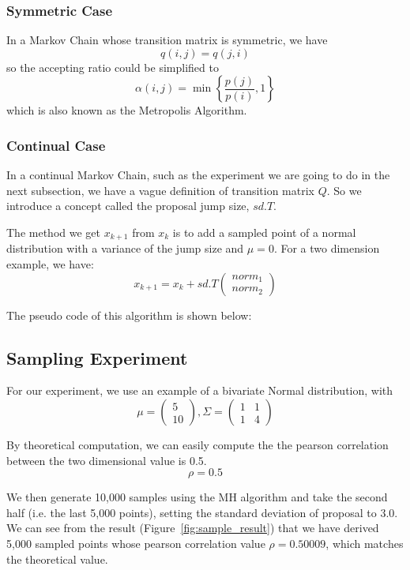 \subsubsection{Symmetric Case}
In a Markov Chain whose transition matrix is symmetric, we have
$$q(i,j)=q(j,i)$$
so the accepting ratio could be simplified to 
\begin{equation}
\alpha(i,j) = \min\left\{\frac{p(j)}{p(i)},1\right\}
\end{equation}
which is also known as the Metropolis Algorithm\cite{metropolis1953equation}.

\subsubsection{Continual Case}
In a continual Markov Chain, such as the experiment we are going to do in the next subsection, we have a vague definition of transition matrix $Q$. So we introduce a concept called the proposal jump size, $sd.T$.

The method we get $x_{k+1}$ from $x_{k}$ is to add a sampled point of a normal distribution with a variance of the jump size and $\mu=0$. For a two dimension example, we have:
\begin{equation}
x_{k+1} = x_{k} + sd.T \left( \begin{array}{ccc}
norm_{1} \\
norm_{2} \end{array} \right) 
\end{equation}

The pseudo code of this algorithm is shown below:



\subsection{Sampling Experiment}
For our experiment, we use an example of a bivariate Normal distribution, with
$$ \mu = \left( \begin{array}{ccc}
5 \\
10 \end{array} \right), 
\Sigma = \left( \begin{array}{ccc}
1 & 1\\
1 & 4\end{array} \right)$$

By theoretical computation, we can easily compute the the pearson correlation between the two dimensional value is 0.5.
$$ \rho = 0.5 $$

We then generate 10,000 samples using the MH algorithm and take the second half (i.e. the last 5,000 points), setting the standard deviation of proposal to 3.0. We can see from the result (Figure~\ref{fig:sample_result}) that we have derived 5,000 sampled points whose pearson correlation value $\rho=0.50009$, which matches the theoretical value.

